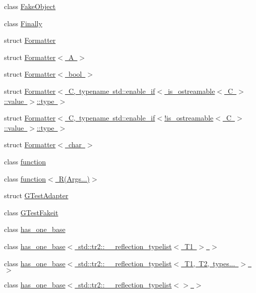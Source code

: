 \begin{DoxyCompactItemize}
\item 
class \mbox{\hyperlink{classfakeit_1_1FakeObject}{Fake\+Object}}
\item 
class \mbox{\hyperlink{classfakeit_1_1Finally}{Finally}}
\item 
struct \mbox{\hyperlink{structfakeit_1_1Formatter}{Formatter}}
\item 
struct \mbox{\hyperlink{structfakeit_1_1Formatter_3_01A_01_4}{Formatter$<$ A $>$}}
\item 
struct \mbox{\hyperlink{structfakeit_1_1Formatter_3_01bool_01_4}{Formatter$<$ bool $>$}}
\item 
struct \mbox{\hyperlink{structfakeit_1_1Formatter_3_01C_00_01typename_01std_1_1enable__if_3_01is__ostreamable_3_01C_01_4_1_1value_01_4_1_1type_01_4}{Formatter$<$ C, typename std\+::enable\+\_\+if$<$ is\+\_\+ostreamable$<$ C $>$\+::value $>$\+::type $>$}}
\item 
struct \mbox{\hyperlink{structfakeit_1_1Formatter_3_01C_00_01typename_01std_1_1enable__if_3_9is__ostreamable_3_01C_01_4_1_1value_01_4_1_1type_01_4}{Formatter$<$ C, typename std\+::enable\+\_\+if$<$!is\+\_\+ostreamable$<$ C $>$\+::value $>$\+::type $>$}}
\item 
struct \mbox{\hyperlink{structfakeit_1_1Formatter_3_01char_01_4}{Formatter$<$ char $>$}}
\item 
class \mbox{\hyperlink{classfakeit_1_1function}{function}}
\item 
class \mbox{\hyperlink{classfakeit_1_1function_3_01R_07Args_8_8_8_08_4}{function$<$ R(\+Args...)$>$}}
\item 
struct \mbox{\hyperlink{structfakeit_1_1GTestAdapter}{G\+Test\+Adapter}}
\item 
class \mbox{\hyperlink{classfakeit_1_1GTestFakeit}{G\+Test\+Fakeit}}
\item 
class \mbox{\hyperlink{classfakeit_1_1has__one__base}{has\+\_\+one\+\_\+base}}
\item 
class \mbox{\hyperlink{classfakeit_1_1has__one__base_3_01std_1_1tr2_1_1____reflection__typelist_3_01T1_01_4_01_4}{has\+\_\+one\+\_\+base$<$ std\+::tr2\+::\+\_\+\+\_\+reflection\+\_\+typelist$<$ T1 $>$ $>$}}
\item 
class \mbox{\hyperlink{classfakeit_1_1has__one__base_3_01std_1_1tr2_1_1____reflection__typelist_3_01T1_00_01T2_00_01types_8_8_8_01_4_01_4}{has\+\_\+one\+\_\+base$<$ std\+::tr2\+::\+\_\+\+\_\+reflection\+\_\+typelist$<$ T1, T2, types... $>$ $>$}}
\item 
class \mbox{\hyperlink{classfakeit_1_1has__one__base_3_01std_1_1tr2_1_1____reflection__typelist_3_4_01_4}{has\+\_\+one\+\_\+base$<$ std\+::tr2\+::\+\_\+\+\_\+reflection\+\_\+typelist$<$$>$ $>$}}

\end{DoxyCompactItemize}
